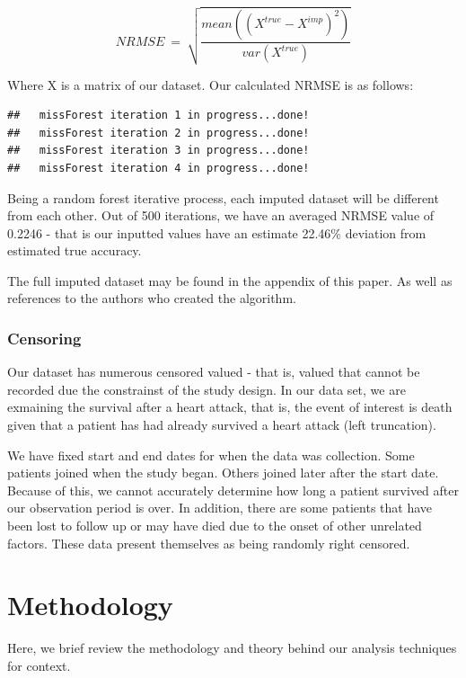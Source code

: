 \documentclass[
]{article}
\begin{document}
\[ NRMSE\ =\ \sqrt{\frac{mean\left(\left(X^{true}-X^{imp}\right)^2\right)}{var\left(X^{true}\right)}} \]

Where X is a matrix of our dataset. Our calculated NRMSE is as follows:

\begin{verbatim}
##   missForest iteration 1 in progress...done!
##   missForest iteration 2 in progress...done!
##   missForest iteration 3 in progress...done!
##   missForest iteration 4 in progress...done!
\end{verbatim}

Being a random forest iterative process, each imputed dataset will be
different from each other. Out of 500 iterations, we have an averaged
NRMSE value of 0.2246 - that is our inputted values have an estimate
22.46\% deviation from estimated true accuracy.

The full imputed dataset may be found in the appendix of this paper. As
well as references to the authors who created the algorithm.

\hypertarget{censoring}{%
\subsubsection{Censoring}\label{censoring}}

Our dataset has numerous censored valued - that is, valued that cannot
be recorded due the constrainst of the study design. In our data set, we
are exmaining the survival after a heart attack, that is, the event of
interest is death given that a patient has had already survived a heart
attack (left truncation).

We have fixed start and end dates for when the data was collection. Some
patients joined when the study began. Others joined later after the
start date. Because of this, we cannot accurately determine how long a
patient survived after our observation period is over. In addition,
there are some patients that have been lost to follow up or may have
died due to the onset of other unrelated factors. These data present
themselves as being randomly right censored.

\hypertarget{methodology}{%
\section{Methodology}\label{methodology}}

Here, we brief review the methodology and theory behind our analysis
techniques for context.
\end{document}
